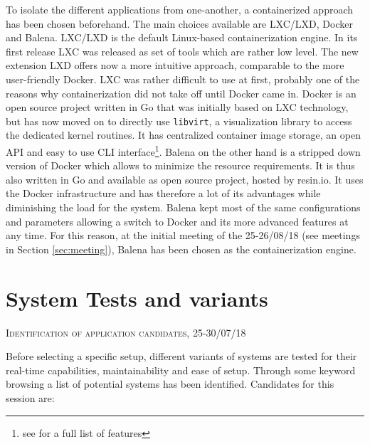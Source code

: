 \documentclass[]{scrartcl}
\begin{document}
To isolate the different applications from one-another, a containerized approach has been chosen beforehand. The main choices available are LXC/LXD, Docker and Balena.
%
LXC/LXD is the default Linux-based containerization engine. In its first release LXC was released as set of tools which are rather low level. The new extension LXD offers now a more intuitive approach, comparable to the more user-friendly Docker. LXC was rather difficult to use at first, probably one of the reasons why containerization did not take off until Docker came in. 
Docker is an open source project written in Go that was initially based on LXC technology, but has now moved on to directly use \texttt{libvirt}, a visualization library to access the dedicated kernel routines. It has centralized container image storage, an open API and easy to use CLI interface\footnote{see \cite{docker01} for a full list of features}. 
Balena on the other hand is a stripped down version of Docker which allows to minimize the resource requirements. It is thus also written in Go and available as open source project, hosted by resin.io. It uses the Docker infrastructure and has therefore a lot of its advantages while diminishing the load for the system. 
Balena kept most of the same configurations and parameters allowing a switch to Docker and its more advanced features at any time. For this reason, at the initial meeting of the 25-26/08/18 (see meetings in Section \ref{sec:meeting}), Balena has been chosen as the containerization engine. 

\section{System Tests and variants}

{\small\textsc{Identification of application candidates, 25-30/07/18} \bigskip}

Before selecting a specific setup, different variants of systems are tested for their real-time capabilities, maintainability and ease of setup.
Through some keyword browsing a list of potential systems has been identified.
Candidates for this session are:
\end{document}
